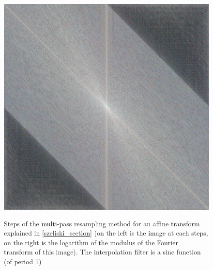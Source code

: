 \begin{figure}
{			{\includegraphics[scale=0.125]{decompoSzeliski_sinc_fourier4.png}}
		}
		\caption{Steps of the multi-pass resampling method for an affine transform explained in \ref{szeliski_section} (on the left is the image at each steps, on the right is the logarithm of the modulus of the Fourier transform of this image). The interpolation filter is a sinc function (of period 1)}
		\label{experiments_decompoSzeliski_sinc}
	\end{figure}

